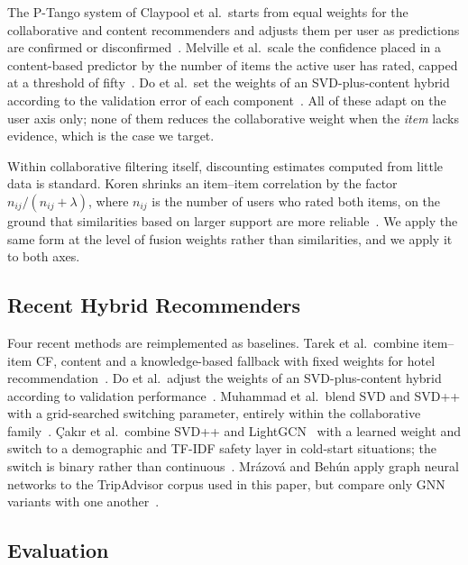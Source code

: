\documentclass[runningheads]{llncs}
\begin{document}
The P-Tango system of Claypool et al.\ starts from equal weights for the collaborative and content recommenders and adjusts them per user as predictions are confirmed or disconfirmed~\cite{claypool1999}. Melville et al.\ scale the confidence placed in a content-based predictor by the number of items the active user has rated, capped at a threshold of fifty~\cite{melville2002}. Do et al.\ set the weights of an SVD-plus-content hybrid according to the validation error of each component~\cite{do2020}. All of these adapt on the user axis only; none of them reduces the collaborative weight when the \emph{item} lacks evidence, which is the case we target.

Within collaborative filtering itself, discounting estimates computed from little data is standard. Koren shrinks an item--item correlation by the factor $n_{ij}/(n_{ij}+\lambda)$, where $n_{ij}$ is the number of users who rated both items, on the ground that similarities based on larger support are more reliable~\cite{koren2008}. We apply the same form at the level of fusion weights rather than similarities, and we apply it to both axes.

\subsection{Recent Hybrid Recommenders}

Four recent methods are reimplemented as baselines. Tarek et al.\ combine item--item CF, content and a knowledge-based fallback with fixed weights for hotel recommendation~\cite{tarek2022}. Do et al.\ adjust the weights of an SVD-plus-content hybrid according to validation performance~\cite{do2020}. Muhammad et al.\ blend SVD and SVD++ with a grid-searched switching parameter, entirely within the collaborative family~\cite{ohwsf2025}. \c{C}ak{\i}r et al.\ combine SVD++ and LightGCN~\cite{lightgcn2020} with a learned weight and switch to a demographic and TF-IDF safety layer in cold-start situations; the switch is binary rather than continuous~\cite{slarec2026}. Mr\'azov\'a and Beh\'un apply graph neural networks to the TripAdvisor corpus used in this paper, but compare only GNN variants with one another~\cite{mrazova2023}.

\subsection{Evaluation}
\end{document}
